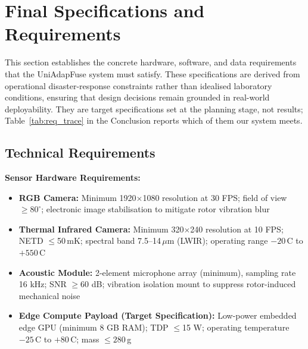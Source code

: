 
\section{Final Specifications and Requirements}

This section establishes the concrete hardware, software, and data requirements that the UniAdapFuse system must satisfy. These specifications are derived from operational disaster-response constraints rather than idealised laboratory conditions, ensuring that design decisions remain grounded in real-world deployability. They are target specifications set at the planning stage, not results; Table~\ref{tab:req_trace} in the Conclusion reports which of them our system meets.

\subsection{Technical Requirements}
\label{sec:tech_requirements}

\textbf{Sensor Hardware Requirements:}
\begin{itemize}
    \item \textbf{RGB Camera:} Minimum 1920$\times$1080 resolution at 30 FPS; field of view $\geq 80^{\circ}$; electronic image stabilisation to mitigate rotor vibration blur
    \item \textbf{Thermal Infrared Camera:} Minimum 320$\times$240 resolution at 10 FPS; NETD $\leq$50\,mK; spectral band 7.5--14\,$\mu$m (LWIR); operating range $-20$\,\textdegree{}C to $+550$\,\textdegree{}C
    \item \textbf{Acoustic Module:} 2-element microphone array (minimum), sampling rate 16 kHz; SNR $\geq$60 dB; vibration isolation mount to suppress rotor-induced mechanical noise
    \item \textbf{Edge Compute Payload (Target Specification):} Low-power embedded edge GPU (minimum 8 GB RAM); TDP $\leq$15 W; operating temperature $-25$\,\textdegree C to $+80$\,\textdegree C; mass $\leq 280$\,g
\end{itemize}

